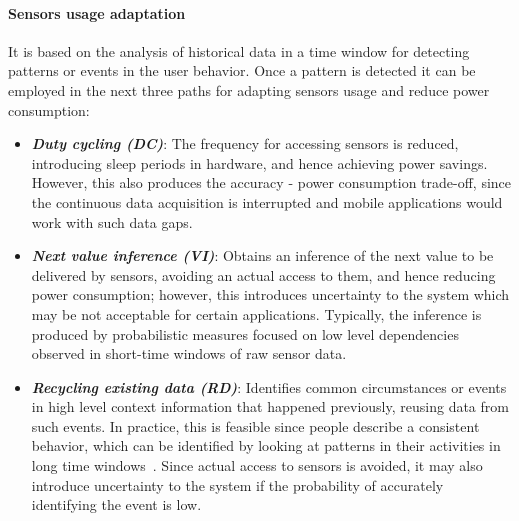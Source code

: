 \documentclass[ENG,PhD]{cinvestav}
\begin{document}
\paragraph{Sensors usage adaptation}
It is based on the analysis of historical data in a time window for detecting patterns or events in the user behavior.
Once a pattern is detected it can be employed in the next three paths for adapting sensors usage and reduce power consumption:
\begin{itemize}
  \item \emph{\textbf{Duty cycling (DC)}}:  The frequency for accessing sensors is reduced, introducing sleep periods in hardware, and hence achieving power savings.
  However, this also produces the accuracy - power consumption trade-off, since the continuous data acquisition is interrupted and mobile applications would work with such data gaps.
  \item \emph{\textbf{Next value inference (VI)}}: Obtains an inference of the next value to be delivered by sensors, avoiding an actual access to them, and hence reducing power consumption; however, this introduces uncertainty to the system which may be not acceptable for certain applications.
  Typically, the inference is produced by probabilistic measures focused on low level dependencies observed in short-time windows of raw sensor data.
  \item \emph{\textbf{Recycling existing data (RD)}}: Identifies common circumstances or events in high level context information that happened previously, reusing data from such events.
  In practice, this is feasible since people describe a consistent behavior, which can be identified by looking at patterns in their activities in long time windows~\cite{Chon2011,Paek2011}.
  Since actual access to sensors is avoided, it may also introduce uncertainty to the system if the probability of accurately identifying the event is low.
\end{itemize}
\end{document}
